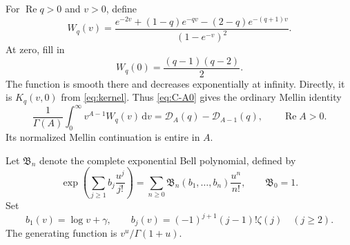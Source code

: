 \documentclass[11pt]{article}
\numberwithin{equation}{section}
\theoremstyle{definition}
\DeclareMathOperator{\Rea}{Re}
\newcommand{\dd}{\,\mathrm d}
\newcommand{\DD}{\mathcal D}
\begin{document}
For $\Rea q>0$ and $v>0$, define
\begin{equation}\label{eq:W}
 W_q(v)=\frac{e^{-2v}+(1-q)e^{-qv}-(2-q)e^{-(q+1)v}}{(1-e^{-v})^2}.
\end{equation}
At zero, fill in
\begin{equation}\label{eq:W-zero}
 W_q(0)=\frac{(q-1)(q-2)}2.
\end{equation}
The function is smooth there and decreases exponentially at infinity. Directly, it is $K_q(v,0)$ from \eqref{eq:kernel}. Thus \eqref{eq:C-A0} gives the ordinary Mellin identity
\begin{equation}\label{eq:W-Mellin}
 \frac1{\Gamma(A)}\int_0^\infty v^{A-1}W_q(v)\dd v
 =\DD_A(q)-\DD_{A-1}(q),\qquad \Rea A>0.
\end{equation}
Its normalized Mellin continuation is entire in $A$.

Let $\mathfrak B_n$ denote the complete exponential Bell polynomial, defined by
\[
 \exp\!\left(\sum_{j\ge1}b_j\frac{u^j}{j!}\right)
 =\sum_{n\ge0}\mathfrak B_n(b_1,\ldots,b_n)\frac{u^n}{n!},
 \qquad \mathfrak B_0=1.
\]
Set
\begin{equation}\label{eq:Bell-args}
 b_1(v)=\log v+\gamma,\qquad
 b_j(v)=(-1)^{j+1}(j-1)!\zeta(j)\quad(j\ge2).
\end{equation}
The generating function is $v^u/\Gamma(1+u)$.
\end{document}
